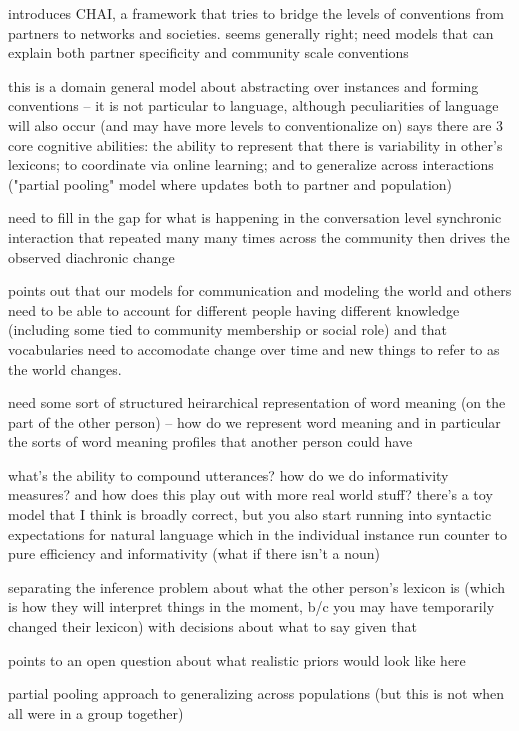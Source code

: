 \documentclass[]{article}
\begin{document}
\cite{hawkins2021} introduces CHAI, a framework that tries to bridge the levels of conventions from partners to networks and societies. seems generally right; need models that can explain both partner specificity and community scale conventions

this is a domain general model about abstracting over instances and forming conventions -- it is not particular to language, although peculiarities of language will also occur (and may have more levels to conventionalize on) 
\cite{hawkins2021} says there are 3 core cognitive abilities: the ability to represent that there is variability in other's lexicons; to coordinate via online learning; and to generalize across interactions ("partial pooling" model where updates both to partner and population) 

need to fill in the gap for what is happening in the conversation level synchronic interaction that repeated many many times across the community then drives the observed diachronic change 

\cite{hawkins2021} points out that our models for communication and modeling the world and others need to be able to account for different people having different knowledge (including some tied to community membership or social role) and that vocabularies need to accomodate change over time and new things to refer to as the world changes. 


need some sort of structured heirarchical representation of word meaning (on the part of the other person) -- how do we represent word meaning and in particular the sorts of word meaning profiles that another person could have 

what's the ability to compound utterances? how do we do informativity measures? and how does this play out with more real world stuff? there's a toy model that I think is broadly correct, but you also start running into syntactic expectations for natural language which in the individual instance run counter to pure efficiency and informativity (what if there isn't a noun) 

\cite{hawkins2021} separating the inference problem about what the other person's lexicon is (which is how they will interpret things in the moment, b/c you may have temporarily changed their lexicon) with decisions about what to say given that 

points to an open question about what realistic priors would look like here

partial pooling approach to generalizing across populations (but this is not when all were in a group together) 
\end{document}

